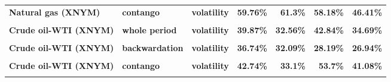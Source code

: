 \documentclass[
  authoryear,
  preprint,
  3p]{elsarticle}
\begin{document}
\begin{longtable}[t]{>{}l>{}l>{}l>{}r>{}r>{}r>{}r}
\addlinespace
\textbf{Natural gas (XNYM)} & \textbf{contango} & \textbf{volatility} & \textcolor[HTML]{4285f4}{\textbf{59.76\%}} & \textcolor[HTML]{4285f4}{\textbf{61.3\%}} & \textcolor[HTML]{4285f4}{\textbf{58.18\%}} & \textcolor[HTML]{4285f4}{\textbf{46.41\%}}\\
\textbf{\cellcolor{gray!10}{Crude oil-WTI (XNYM)}} & \textbf{\cellcolor{gray!10}{whole period}} & \textbf{\cellcolor{gray!10}{mean}} & \textcolor[HTML]{4285f4}{\textbf{\cellcolor{gray!10}{15.43\%}}} & \textcolor[HTML]{4285f4}{\textbf{\cellcolor{gray!10}{*28.74\%}}} & \textcolor[HTML]{4285f4}{\textbf{\cellcolor{gray!10}{9.67\%}}} & \textcolor[HTML]{4285f4}{\textbf{\cellcolor{gray!10}{-5.64\%}}}\\
\textbf{Crude oil-WTI (XNYM)} & \textbf{whole period} & \textbf{volatility} & \textcolor[HTML]{4285f4}{\textbf{39.87\%}} & \textcolor[HTML]{4285f4}{\textbf{32.56\%}} & \textcolor[HTML]{4285f4}{\textbf{42.84\%}} & \textcolor[HTML]{4285f4}{\textbf{34.69\%}}\\
\textbf{\cellcolor{gray!10}{Crude oil-WTI (XNYM)}} & \textbf{\cellcolor{gray!10}{backwardation}} & \textbf{\cellcolor{gray!10}{mean}} & \textcolor[HTML]{4285f4}{\textbf{\cellcolor{gray!10}{29.17\%}}} & \textcolor[HTML]{4285f4}{\textbf{\cellcolor{gray!10}{*35.61\%}}} & \textcolor[HTML]{4285f4}{\textbf{\cellcolor{gray!10}{11.47\%}}} & \textcolor[HTML]{4285f4}{\textbf{\cellcolor{gray!10}{14.24\%}}}\\
\textbf{Crude oil-WTI (XNYM)} & \textbf{backwardation} & \textbf{volatility} & \textcolor[HTML]{4285f4}{\textbf{36.74\%}} & \textcolor[HTML]{4285f4}{\textbf{32.09\%}} & \textcolor[HTML]{4285f4}{\textbf{28.19\%}} & \textcolor[HTML]{4285f4}{\textbf{26.94\%}}\\
\addlinespace
\textbf{\cellcolor{gray!10}{Crude oil-WTI (XNYM)}} & \textbf{\cellcolor{gray!10}{contango}} & \textbf{\cellcolor{gray!10}{mean}} & \textcolor[HTML]{4285f4}{\textbf{\cellcolor{gray!10}{2.21\%}}} & \textcolor[HTML]{4285f4}{\textbf{\cellcolor{gray!10}{22.04\%}}} & \textcolor[HTML]{4285f4}{\textbf{\cellcolor{gray!10}{9.95\%}}} & \textcolor[HTML]{4285f4}{\textbf{\cellcolor{gray!10}{-24.85\%}}}\\
\textbf{Crude oil-WTI (XNYM)} & \textbf{contango} & \textbf{volatility} & \textcolor[HTML]{4285f4}{\textbf{42.74\%}} & \textcolor[HTML]{4285f4}{\textbf{33.1\%}} & \textcolor[HTML]{4285f4}{\textbf{53.7\%}} & \textcolor[HTML]{4285f4}{\textbf{41.08\%}}\\
\textbf{\cellcolor{gray!10}{Gasoline (XNYM)}} & \textbf{\cellcolor{gray!10}{whole period}} & \textbf{\cellcolor{gray!10}{mean}} & \textcolor[HTML]{4285f4}{\textbf{\cellcolor{gray!10}{16.65\%}}} & \textcolor[HTML]{4285f4}{\textbf{\cellcolor{gray!10}{30.95\%}}} & \textcolor[HTML]{4285f4}{\textbf{\cellcolor{gray!10}{10.59\%}}} & \textcolor[HTML]{4285f4}{\textbf{\cellcolor{gray!10}{-5.37\%}}}\\

\end{longtable}
\end{document}

